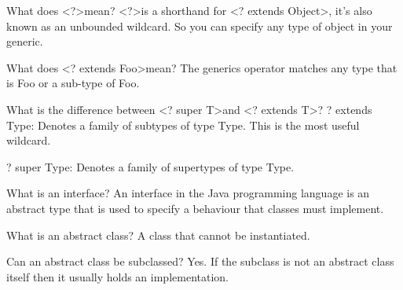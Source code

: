 \begin{flashcard}[Core]{What does \textless?\textgreater mean?}
\textless?\textgreater is a shorthand for \textless? extends Object\textgreater , it's also known as an unbounded wildcard. So you can specify any type of object in your generic.
\end{flashcard}

\begin{flashcard}[Lang]{What does \textless? extends Foo\textgreater mean?}
The generics operator matches any type that is Foo or a sub-type of Foo.
\end{flashcard}

\begin{flashcard}[Lang]{What is the difference between \textless? super T\textgreater and \textless? extends T\textgreater ?}
? extends Type: Denotes a family of subtypes of type Type. This is the most useful wildcard.

? super Type: Denotes a family of supertypes of type Type.
\end{flashcard}

\begin{flashcard}[Lang]{What is an interface?}
An interface in the Java programming language is an abstract type that is used to specify a behaviour that classes must implement.
\end{flashcard}

\begin{flashcard}[Lang]{What is an abstract class?}
A class that cannot be instantiated.
\end{flashcard}

\begin{flashcard}[Lang]{Can an abstract class be subclassed?}
Yes. If the subclass is not an abstract class itself then it usually holds an implementation.
\end{flashcard}

